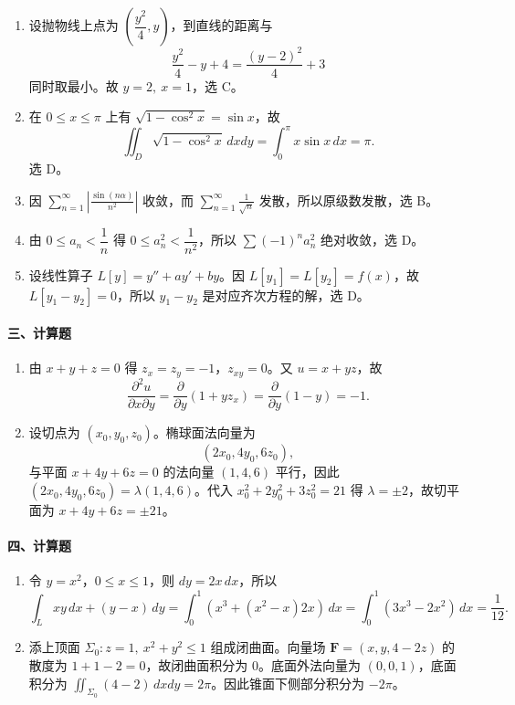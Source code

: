 \begin{enumerate}
  \item 设抛物线上点为 $\left(\dfrac{y^2}{4},y\right)$，到直线的距离与
  \[
    \frac{y^2}{4}-y+4=\frac{(y-2)^2}{4}+3
  \]
  同时取最小。故 $y=2,\ x=1$，选 C。
  \item 在 $0\le x\le\pi$ 上有 $\sqrt{1-\cos^2x}=\sin x$，故
  \[
    \iint_D\sqrt{1-\cos^2x}\,dxdy=\int_0^\pi x\sin x\,dx=\pi.
  \]
  选 D。
  \item 因 $\displaystyle\sum_{n=1}^\infty \left|\frac{\sin(n\alpha)}{n^2}\right|$ 收敛，而 $\displaystyle\sum_{n=1}^\infty\frac1{\sqrt n}$ 发散，所以原级数发散，选 B。
  \item 由 $0\le a_n<\dfrac1n$ 得 $0\le a_n^2<\dfrac1{n^2}$，所以 $\displaystyle\sum(-1)^na_n^2$ 绝对收敛，选 D。
  \item 设线性算子 $L[y]=y''+ay'+by$。因 $L[y_1]=L[y_2]=f(x)$，故 $L[y_1-y_2]=0$，所以 $y_1-y_2$ 是对应齐次方程的解，选 D。
\end{enumerate}

\paragraph*{三、计算题}

\begin{enumerate}
  \item 由 $x+y+z=0$ 得 $z_x=z_y=-1$，$z_{xy}=0$。又 $u=x+yz$，故
  \[
    \frac{\partial^2u}{\partial x\partial y}
    =
    \frac{\partial}{\partial y}\left(1+yz_x\right)
    =
    \frac{\partial}{\partial y}(1-y)=-1.
  \]

  \item 设切点为 $(x_0,y_0,z_0)$。椭球面法向量为
  \[
    (2x_0,4y_0,6z_0),
  \]
  与平面 $x+4y+6z=0$ 的法向量 $(1,4,6)$ 平行，因此
  \(\displaystyle (2x_0,4y_0,6z_0)=\lambda(1,4,6)\)。代入 $x_0^2+2y_0^2+3z_0^2=21$ 得 $\lambda=\pm2$，故切平面为
  \(\displaystyle x+4y+6z=\pm 21\)。
\end{enumerate}

\paragraph*{四、计算题}

\begin{enumerate}
  \item 令 $y=x^2$，$0\le x\le 1$，则 $dy=2x\,dx$，所以
  \[
    \int_L xy\,dx+(y-x)\,dy
    =
    \int_0^1\left(x^3+(x^2-x)2x\right)\,dx
    =
    \int_0^1(3x^3-2x^2)\,dx
    =
    \frac1{12}.
  \]

  \item 添上顶面 $\Sigma_0:z=1,\ x^2+y^2\le1$ 组成闭曲面。向量场 \(\displaystyle \mathbf F=(x,y,4-2z)\)
  的散度为 $1+1-2=0$，故闭曲面积分为 $0$。底面外法向量为 $(0,0,1)$，底面积分为
  \(\displaystyle \iint_{\Sigma_0}(4-2)\,dxdy=2\pi\)。因此锥面下侧部分积分为 $-2\pi$。
\end{enumerate}

